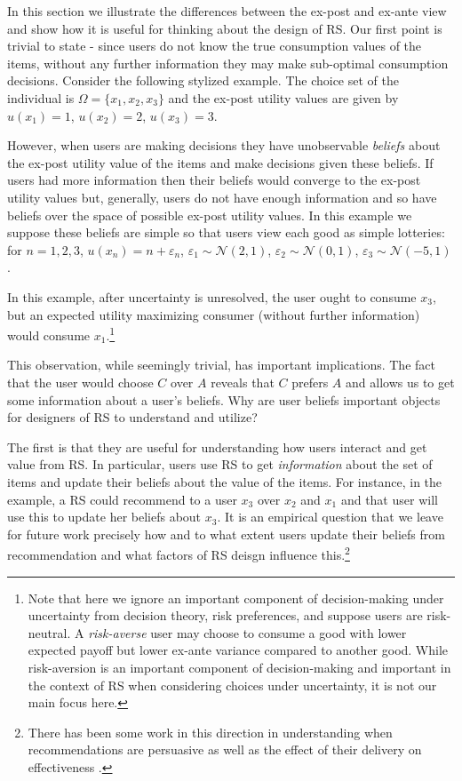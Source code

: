 \documentclass[sigconf]{acmart}
\begin{document}
In this section we illustrate the differences between the ex-post and ex-ante view and show how it is useful for thinking about the design of RS. Our first point is trivial to state - since users do not know the true consumption values of the items, without any further information they may make sub-optimal consumption decisions. Consider the following stylized example. The choice set of the individual is $\Omega= \{x_1, x_2, x_3 \}$ and the ex-post utility values are given by
$u(x_1) = 1$, $u(x_2) = 2$, $u(x_3) = 3$. 
\par
However, when users are making decisions they have unobservable \textit{beliefs} about the ex-post utility value of the items and make decisions given these beliefs. If users had more information then their beliefs would converge to the ex-post utility values but, generally, users do not have enough information and so have beliefs over the space of possible ex-post utility values. In this example we suppose these beliefs are simple so that users view each good as simple lotteries: for $n=1,2,3$, $u(x_n) = n + \varepsilon_n$, $\varepsilon_1 \sim \mathcal N (2, 1)$, $\varepsilon_2 \sim \mathcal N (0, 1)$, $\varepsilon_3 \sim \mathcal N (-5, 1)$.
\par
In this example, after uncertainty is unresolved, the user ought to consume $x_3$, but an expected utility maximizing consumer (without further information) would consume $x_1$.\footnote{Note that here we ignore an important component of decision-making under uncertainty from decision theory, risk preferences, and suppose users are risk-neutral. A \textit{risk-averse} user may choose to consume a good with lower expected payoff but lower ex-ante variance compared to another good. While risk-aversion is an important component of decision-making and important in the context of RS when considering choices under uncertainty, it is not our main focus here.}
\par
This observation, while seemingly trivial, has important implications. The fact that the user would choose $C$ over $A$ reveals that $C$ prefers $A$ and allows us to get some information about a user's beliefs. Why are user beliefs important objects for designers of RS to understand and utilize?
\par
The first is that they are useful for understanding how users interact and get value from RS. In particular, users use RS to get \textit{information} about the set of items and update their beliefs about the value of the items. For instance, in the example, a RS could recommend to a user $x_3$ over $x_2$ and $x_1$ and that user will use this to update her beliefs about $x_3$. It is an empirical question that we leave for future work precisely how and to what extent users update their beliefs from recommendation and what factors of RS deisgn influence this.\footnote{There has been some work in this direction in understanding when recommendations are persuasive \cite{cremonesi2012investigating, gretzel2006persuasion} as well as the effect of their delivery on effectiveness \cite{murphy2014recommendation}.}
\end{document}
